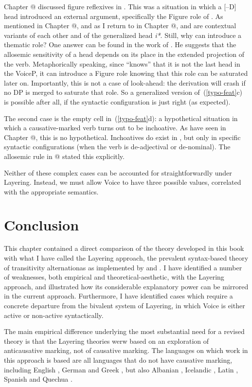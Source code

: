 Chapter @ discussed figure reflexives in {\tnif}. This was a situation in which a [--D] head introduced an external argument, specifically the Figure role of {\pz}. As mentioned in Chapter @, and as I return to in Chapter @, {\pz} and {\vz} are contextual variants of each other and of the generalized head \emph{i*}. Still, why can {\pz} introduce a thematic role? One answer can be found in the work of \cite{wood15springer}. He suggests that the allosemic sensitivity of a head depends on its place in the extended projection of the verb. Metaphorically speaking, since {\pz} ``knows'' that it is not the last head in the VoiceP, it can introduce a Figure role knowing that this role can be saturated later on. Importantly, this is not a case of look-ahead: the derivation will crash if no DP is merged to saturate that role. So a generalized version of~(\ref{typo-feat}c) is possible after all, if the syntactic configuration is just right (as expected).

The second case is the empty cell in~(\ref{typo-feat}d): a hypothetical situation in which a causative-marked verb turns out to be inchoative. As have seen in Chapter @, this is no hypothetical. Inchoatives do exist in {\thif}, but only in specific syntactic configurations (when the verb is de-adjectival or de-nominal). The allosemic rule in @ stated this explicitly.

Neither of these complex cases can be accounted for straightforwardly under Layering. Instead, we must allow Voice to have three possible values, correlated with the appropriate semantics.


\section{Conclusion}
This chapter contained a direct comparison of the theory developed in this book with what I have called the Layering approach, the prevalent syntax-based theory of transitivity alternationas as implemented by \cite{schaefer08} and \cite{layering15}. I have identified a number of weaknesses, both empirical and theoretical-aesthetic, with the Layering approach, and illustrated how its considerable explanatory power can be mirrored in the current approach. Furthermore, I have identified cases which require a concrete departure from the bivalent system of Layering, in which Voice is either active or non-active syntactically.

The main empirical difference underlying the most substantial need for a revised theory is that the Layering theories werw based on an exploration of anticausative marking, not of causative marking. The languages on which work in this approach is based are all languages that do not have causative marking, including English \citep{myler16mit}, German \citep{schaefer17oup} and Greek \citep{spathasetal15}, but also Albanian \citep{kallulli13}, Icelandic \cite{wood15springer}, Latin \citep{embick04,kastnerzu17}, Spanish \citep{schaefervivanco16} and Quechua \citep{myler16mit}.

